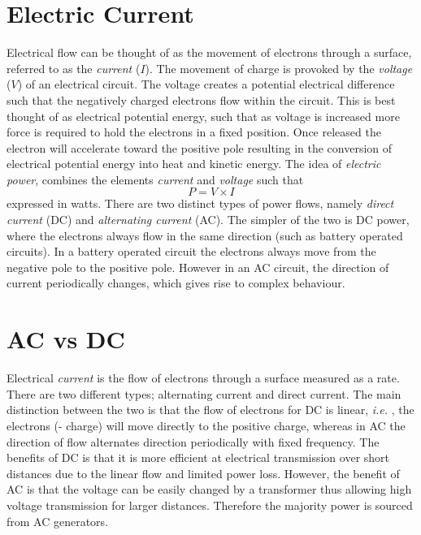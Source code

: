 \documentclass{article}
\newcommand{\ie}{\textit{i.e. }}
\begin{document}
\section{Electric Current}

Electrical flow can be thought of as the movement of electrons through a surface, referred to as the {\it current} ($I$). The movement of charge is provoked by the {\it voltage} ($V$) of an electrical circuit. The voltage creates a potential electrical difference such that the negatively charged electrons flow within the circuit. This is best thought of as electrical potential energy, such that as voltage is increased more force is required to hold the electrons in a fixed position. Once released the electron will accelerate toward the positive pole resulting in the conversion of electrical potential energy into heat and kinetic energy. The idea of {\it electric power}, combines the elements {\it current} and {\it voltage} such that 
\begin{equation}
P=V\times I
\end{equation}
expressed in watts. There are two distinct types of power flows, namely {\it direct current} (DC) and {\it alternating current} (AC). The simpler of the two is DC power, where the electrons always flow in the same direction (such as battery operated circuits). In a battery operated circuit the electrons always move from the negative pole to the positive pole. However in an AC circuit, the direction of current periodically changes, which gives rise to complex behaviour.  


\section{AC vs DC}

Electrical {\it current} is the flow of electrons through a surface measured as a rate. There are two different types; alternating current and direct current. The main distinction between the two is that the flow of electrons for DC is linear, \ie, the electrons (- charge) will move directly to the positive charge, whereas in AC the direction of flow alternates direction periodically with fixed frequency. The benefits of DC is that it is more efficient at electrical transmission over short distances due to the linear flow and limited power loss. However, the benefit of AC is that the voltage can be easily changed by a transformer thus allowing high voltage transmission for larger distances. Therefore the majority power is sourced from AC generators. 
\end{document}
